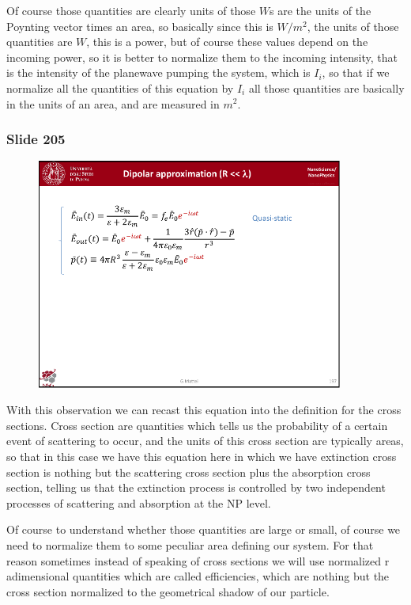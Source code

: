\documentclass[../main/main.tex]{subfiles}
\begin{document}
Of course those quantities are clearly units of those $W$s are the units of the Poynting vector times an area, so basically since this is $W/m^2$, the units of those quantities are $W$, this is a power, but of course these values depend on the incoming power, so it is better to normalize them to the incoming intensity, that is the intensity of the planewave pumping the system, which is $I_i$, so that if we normalize all the quantities of this equation by $I_i$ all those quantities are basically in the units of an area, and are measured in $m^2$.




\newpage

\subsubsection{Slide 205}

\begin{figure}[h!]
\centering
\includegraphics[page=9,width=0.9\textwidth]{../lessons/pdf_file/12_lesson.pdf}
\end{figure}


With this observation we can recast this equation into the definition for the cross sections. Cross section are quantities which tells us the probability of a certain event of scattering to occur, and the units of this cross section are typically areas, so that in this case we have this equation here in which we have extinction cross section is nothing but the scattering cross section plus the absorption cross section, telling us that the extinction process is controlled by two independent processes of scattering and absorption at the NP level.

Of course to understand whether those quantities are large or small, of course we need to normalize them to some peculiar area defining our system. For that reason sometimes instead of speaking of cross sections we will use normalized r adimensional quantities which are called efficiencies, which are nothing but the cross section normalized to the geometrical shadow of our particle.
\end{document}
